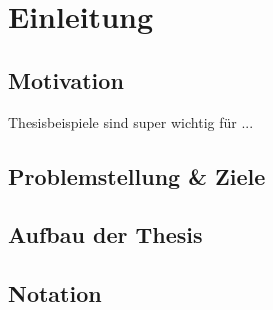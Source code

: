 \chapter{Einleitung}
	\section{Motivation}
		Thesisbeispiele sind super wichtig für ...
		
		
	\section{Problemstellung \& Ziele}
		\blindtext
		
		
	\section{Aufbau der Thesis}
		\blindtext
		
		
	\section{Notation}%
		\blindtext
